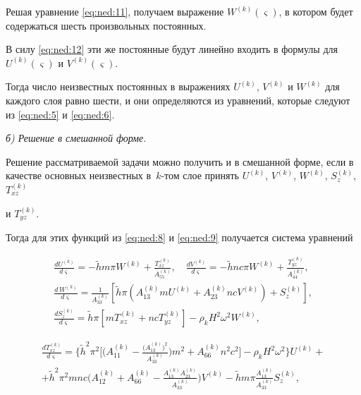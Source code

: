 Решая уравнение \eqref{eq:ned:11}, получаем выражение $W^{(k)}(\varsigma)$, в котором будет содержаться шесть произвольных постоянных. 

В силу \eqref{eq:ned:12} эти же постоянные будут линейно входить в формулы для $U^{(k)}(\varsigma)$ и $V^{(k)}(\varsigma)$. 

Тогда число неизвестных постоянных в выражениях $U^{(k)}$, $V^{(k)}$ и $W^{(k)}$ для каждого слоя равно шести, и они определяются из уравнений, которые следуют из \eqref{eq:ned:5} и \eqref{eq:ned:6}.



\smallskip


{\it б\/\rm ) \it Решение в смешанной форме\/}.

Решение рассматриваемой задачи можно получить и в смешанной форме, если в качестве основных неизвестных в~$k$-том слое принять $U^{(k)}$, $V^{(k)}$, $W^{(k)}$, $S_z^{(k)}$, $T_{xz}^{(k)}$

и $T_{yz}^{(k)}$.



Тогда для этих функций из \eqref{eq:ned:8} и \eqref{eq:ned:9} получается система уравнений

\begin{gather*}

\frac{{dU^{(k)}}}{{d\varsigma}}=-\tilde hm\pi W^{(k)} +\frac{{T_{xz}^{(k)}}}{{A_{55}^{(k)}}},\quad 

%

\frac{{dV^{(k)}}}{{d\varsigma}}=-\tilde hnc\pi W^{(k)} +\frac{{T_{yz}^{(k)}}}{{A_{44}^{(k)}}},\\ 

%

\frac{{d\,W^{(k)}}}{{d\varsigma}}=\frac{1}{{A_{33}^{(k)}}}\left[ {\tilde h\pi\left({A_{13}^{(k)} mU^{(k)}+A_{23}^{(k)} ncV^{(k)}}\right)+S_z^{(k)}}\right],\\ 


\frac{{dS_z^{(k)}}}{{d\varsigma}}=\tilde h\pi\left[ {mT_{xz}^{(k)}+ncT_{yz}^{(k)}}\right]-\rho_k H^2\omega ^2 W^{(k)},

\end{gather*}

\begin{multline}

\label{eq:ned:13}

\frac{dT_{xz}^{(k)}}{d\varsigma}=

\biggl\{\tilde h^2\pi^2 \biggl[\biggl(A_{11}^{(k)}- \frac{\bigl({A_{13}^{(k)}}\bigr)^2}{A_{33}^{(k)}}\biggr)m^2+ A_{66}^{(k)}n^2c^2\biggr]-\rho_kH^2\omega^2\biggr\}U^{(k)}+\\ 

%

+\tilde h^2\pi ^2 mnc\biggl({A_{12}^{(k)}+A_{66}^{(k)} -\frac{{A_{13}^{(k)} A_{23}^{(k)}}}{{A_{33}^{(k)}}}}\biggr)V^{(k)} -\tilde hm\pi\frac{{A_{13}^{(k)}}}{{A_{33}^{(k)}}}S_z^{(k)},

\end{multline}

